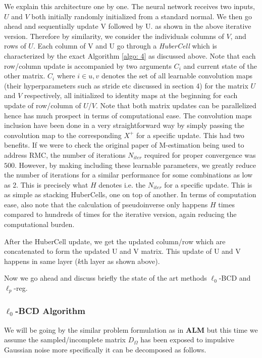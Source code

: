 We explain this architecture one by one. The neural network receives two inputs, $U$ and $V$ both initially randomly initialized from a standard normal. We then go ahead and sequentially update V followed by U. as shown in the above iterative version. Therefore by similarity, we consider the individuals columns of $V$, and rows of $U$. Each column of V and U go through a \textit{HuberCell} which is characterized by the exact Algorithm \ref{algo: 4} as discussed above. Note that each row/column update is accompanied by two arguments $C_i$ and current state of the other matrix. $C_i$ where $i \in {u, v}$ denotes the set of all learnable convolution maps (their hyperparameters such as stride etc discussed in section 4) for the matrix $U$ and $V$ respectively, all initialized to identity maps at the beginning for each update of row/column of $U$/$V$. Note that both matrix updates can be parallelized hence has much prospect in terms of computational ease. The convolution maps inclusion have been done in a very straightforward way by simply passing the convolution map to the corresponding $X^{+}$ for a specific update. This had two benefits. If we were to check the original paper of M-estimation being used to address RMC, the number of iterations $N_{iter}$ required for proper convergence was $500$. However, by making including these learnable parameters, we greatly reduce the number of iterations for a similar performance for some combinations as low as 2. This is precisely what $H$ denotes i.e. the $N_{iter}$ for a specific update. This is as simple as stacking HuberCells, one on top of another. In terms of computation ease, also note that the calculation of pseudoinverse only happens $H$ times compared to hundreds of times for the iterative version, again reducing the computational burden. 

After the HuberCell update, we get the updated column/row which are concatenated to form the updated U and V matrix. This update of U and V happens in same layer (\(k\)th layer as shown above). 

Now we go ahead and discuss briefly the state of the art methods \(\ell_0\)-BCD and \(\ell_p\)-reg.

\subsubsection{\(\ell_0\)-BCD Algorithm}

We will be going by the similar problem formulation as in \textbf{ALM} but this time we assume the sampled/incomplete matrix $D_{\Omega}$ has been exposed to impulsive Gaussian noise more specifically it can be decomposed as follows.

